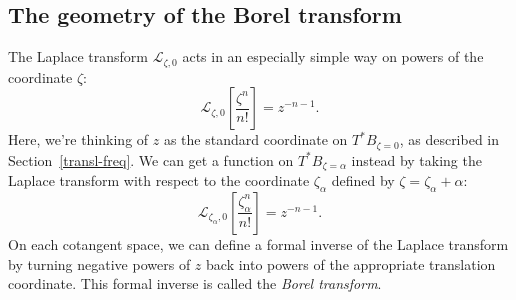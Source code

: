 \documentclass{article}
\theoremstyle{definition}
\newcommand{\fracderiv}[3]{\partial^{#1}_{#2, #3}}
\newcommand{\laplace}{\mathcal{L}}
\begin{document}




\subsection{The geometry of the Borel transform}
The Laplace transform $\laplace_{\zeta, 0}$ acts in an especially simple way on powers of the coordinate $\zeta$:
\[ \laplace_{\zeta, 0}\left[\frac{\zeta^n}{n!}\right] = z^{-n-1}. \]
Here, we're thinking of $z$ as the standard coordinate on $T^*B_{\zeta = 0}$, as described in Section~\ref{transl-freq}. We can get a function on $T^*B_{\zeta = \alpha}$ instead by taking the Laplace transform with respect to the coordinate $\zeta_\alpha$ defined by $\zeta = \zeta_\alpha + \alpha$:
\[ \laplace_{\zeta_\alpha, 0}\left[\frac{\zeta_\alpha^n}{n!}\right] = z^{-n-1}. \]
On each cotangent space, we can define a formal inverse of the Laplace transform by turning negative powers of $z$ back into powers of the appropriate translation coordinate. This formal inverse is called the {\em Borel transform}.
\end{document}
